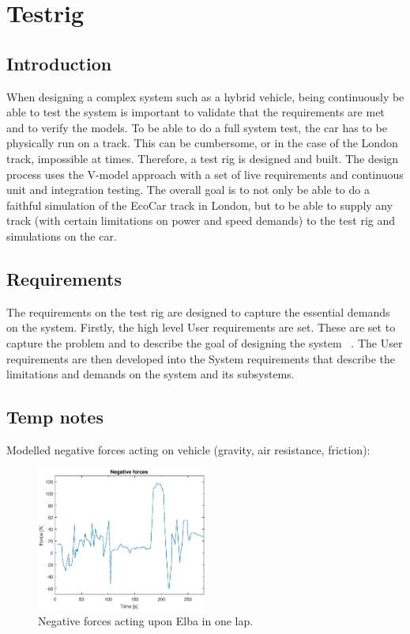 \chapter{Testrig}
\section{Introduction}
When designing a complex system such as a hybrid vehicle, being continuously be
able to test the system is important to validate that the requirements are met
and to verify the models. To be able to do a full system test, the car has to be
physically run on a track. This can be cumbersome, or in the case of the London
track, impossible at times. Therefore, a test rig is designed and built. The
design process uses the V-model approach with a set of live requirements and
continuous unit and integration testing. The overall goal is to not only be able
to do a faithful simulation of the EcoCar track in London, but to be able to
supply any track (with certain limitations on power and speed demands) to the
test rig and simulations on the car.

\section{Requirements}
The requirements on the test rig are designed to capture the essential demands
on the system. Firstly, the high level User requirements are set. These are set
to capture the problem and to describe the goal of designing the system
~\cite{ibm_req}. The User requirements are then developed into the System
requirements that describe the limitations and demands on the system and its
subsystems.

\section{Temp notes}
Modelled negative forces acting on vehicle (gravity, air resistance, friction): 

\begin{figure}[H]
    \centering
    \label{fig:testrig_negative_forces}
    \includegraphics[width=0.5\textwidth]{./img/testrig_negative_forces.eps}
    \caption{Negative forces acting upon Elba in one lap.}
\end{figure}

